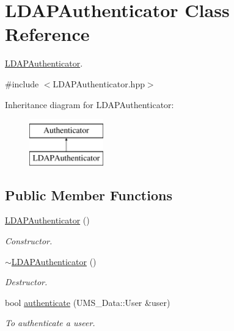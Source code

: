 \hypertarget{classLDAPAuthenticator}{
\section{LDAPAuthenticator Class Reference}
\label{classLDAPAuthenticator}
}


\hyperlink{classLDAPAuthenticator}{LDAPAuthenticator}.  




{\ttfamily \#include $<$LDAPAuthenticator.hpp$>$}

Inheritance diagram for LDAPAuthenticator:\begin{figure}[H]
\begin{center}
\leavevmode
\includegraphics[height=2.000000cm]{classLDAPAuthenticator}
\end{center}
\end{figure}
\subsection*{Public Member Functions}
\begin{DoxyCompactItemize}
\item 
\hypertarget{classLDAPAuthenticator_a487cf58dd4ddc482621955355dd88aa5}{
\hyperlink{classLDAPAuthenticator_a487cf58dd4ddc482621955355dd88aa5}{LDAPAuthenticator} ()}
\label{classLDAPAuthenticator_a487cf58dd4ddc482621955355dd88aa5}

\begin{DoxyCompactList}\small\item\em Constructor. \item\end{DoxyCompactList}\item 
\hypertarget{classLDAPAuthenticator_a5d3f6b405fd9b8a66a0d63fc523bc0cb}{
\hyperlink{classLDAPAuthenticator_a5d3f6b405fd9b8a66a0d63fc523bc0cb}{$\sim$LDAPAuthenticator} ()}
\label{classLDAPAuthenticator_a5d3f6b405fd9b8a66a0d63fc523bc0cb}

\begin{DoxyCompactList}\small\item\em Destructor. \item\end{DoxyCompactList}\item 
bool \hyperlink{classLDAPAuthenticator_a98d0ba707a1ae2bd264da0aac7180f02}{authenticate} (UMS\_\-Data::User \&user)
\begin{DoxyCompactList}\small\item\em To authenticate a useer. \item\end{DoxyCompactList}\end{DoxyCompactItemize}


